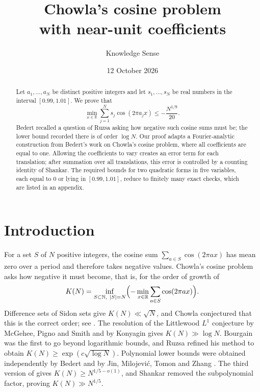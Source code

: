 \documentclass{amsart}
\theoremstyle{remark}
\numberwithin{equation}{section}
\numberwithin{table}{section}
\newcommand{\N}{\mathbb{N}}
\newcommand{\R}{\mathbb{R}}
\begin{document}
\title[Chowla's cosine problem with near-unit coefficients]{Chowla's cosine problem\\ with near-unit coefficients}
\author{Knowledge Sense}
\date{12 October 2026}

\begin{abstract}
Let $a_1,\dots,a_N$ be distinct positive integers and let $s_1,\dots,s_N$ be real numbers in the interval $[0.99,1.01]$. We prove that
\[
\min_{x\in\R}\sum_{j=1}^{N}s_j\cos(2\pi a_jx)\le-\frac{N^{1/9}}{20}.
\]
Bedert recalled a question of Ruzsa asking how negative such cosine sums must be; the lower bound recorded there is of order $\log N$. Our proof adapts a Fourier-analytic construction from Bedert's work on Chowla's cosine problem, where all coefficients are equal to one. Allowing the coefficients to vary creates an error term for each translation; after summation over all translations, this error is controlled by a counting identity of Shankar. The required bounds for two quadratic forms in five variables, each equal to $0$ or lying in $[0.99,1.01]$, reduce to finitely many exact checks, which are listed in an appendix.
\end{abstract}

\maketitle

\section{Introduction}

For a set $S$ of $N$ positive integers, the cosine sum $\sum_{a\in S}\cos(2\pi ax)$ has mean zero over a period and therefore takes negative values. Chowla's cosine problem \cite{Cho} asks how negative it must become, that is, for the order of growth of
\[
K(N)=\inf_{S\subset\N,\ |S|=N}\Bigl(-\min_{x\in\R}\sum_{a\in S}\cos(2\pi ax)\Bigr).
\]
Difference sets of Sidon sets give $K(N)\ll\sqrt N$, and Chowla conjectured that this is the correct order; see \cite[Section~1]{Bed}. The resolution of the Littlewood $L^1$ conjecture by McGehee, Pigno and Smith \cite{MPS} and by Konyagin \cite{Kon} gives $K(N)\gg\log N$. Bourgain \cite{Bou} was the first to go beyond logarithmic bounds, and Ruzsa \cite{Ruz} refined his method to obtain $K(N)\ge\exp(c\sqrt{\log N})$. Polynomial lower bounds were obtained independently by Bedert \cite{Bed} and by Jin, Milojevi\'c, Tomon and Zhang \cite{JMTZ}. The third version of \cite{Bed} gives $K(N)\ge N^{1/5-o(1)}$, and Shankar \cite{Sha} removed the subpolynomial factor, proving $K(N)\gg N^{1/5}$.
\end{document}
